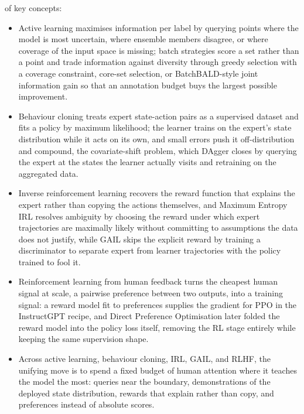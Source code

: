 \vspace{1.5em}

 of key concepts:

\begin{itemize}
    \item Active learning maximises information per label by querying points where the model is most uncertain, where ensemble members disagree, or where coverage of the input space is missing; batch strategies score a set rather than a point and trade information against diversity through greedy selection with a coverage constraint, core-set selection, or BatchBALD-style joint information gain so that an annotation budget buys the largest possible improvement.
    \item Behaviour cloning treats expert state-action pairs as a supervised dataset and fits a policy by maximum likelihood; the learner trains on the expert's state distribution while it acts on its own, and small errors push it off-distribution and compound, the covariate-shift problem, which DAgger closes by querying the expert at the states the learner actually visits and retraining on the aggregated data.
    \item Inverse reinforcement learning recovers the reward function that explains the expert rather than copying the actions themselves, and Maximum Entropy IRL resolves ambiguity by choosing the reward under which expert trajectories are maximally likely without committing to assumptions the data does not justify, while GAIL skips the explicit reward by training a discriminator to separate expert from learner trajectories with the policy trained to fool it.
    \item Reinforcement learning from human feedback turns the cheapest human signal at scale, a pairwise preference between two outputs, into a training signal: a reward model fit to preferences supplies the gradient for PPO in the InstructGPT recipe, and Direct Preference Optimisation later folded the reward model into the policy loss itself, removing the RL stage entirely while keeping the same supervision shape.
    \item Across active learning, behaviour cloning, IRL, GAIL, and RLHF, the unifying move is to spend a fixed budget of human attention where it teaches the model the most: queries near the boundary, demonstrations of the deployed state distribution, rewards that explain rather than copy, and preferences instead of absolute scores.
\end{itemize}


